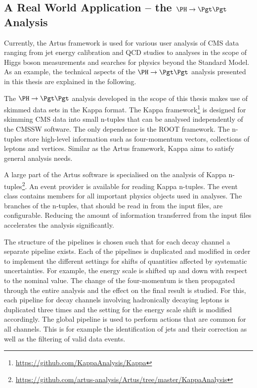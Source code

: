\documentclass[a4paper, oneside, 10pt]{scrartcl}
\begin{document}
\subsection{A Real World Application -- the $\PH\to\Pgt\Pgt$ Analysis \label{section_artus_example_htt}}

Currently, the Artus framework is used for various user analysis of CMS data ranging from jet energy calibration and QCD studies to analyses in the scope of Higgs boson measurements and searches for physics beyond the Standard Model. As an example, the technical aspects of the $\PH\to\Pgt\Pgt$ analysis presented in this thesis are explained in the following.

The $\PH\to\Pgt\Pgt$ analysis developed in the scope of this thesis makes use of skimmed data sets in the Kappa format. The Kappa framework\footnote{\url{https://github.com/KappaAnalysis/Kappa}} is designed for skimming CMS data into small n-tuples that can be analysed independently of the CMSSW software. The only dependence is the ROOT framework. The n-tuples store high-level information such as four-momentum vectors, collections of leptons and vertices. Similar as the Artus framework, Kappa aims to satisfy general analysis needs.

A large part of the Artus software is specialised on the analysis of Kappa n-tuples\footnote{\url{https://github.com/artus-analysis/Artus/tree/master/KappaAnalysis}}. An event provider is available for reading Kappa n-tuples. The event class contains members for all important physics objects used in analyses. The branches of the n-tuples, that should be read in from the input files, are configurable. Reducing the amount of information transferred from the input files accelerates the analysis significantly.

The structure of the pipelines is chosen such that for each decay channel a separate pipeline exists. Each of the pipelines is duplicated and modified in order to implement the different settings for shifts of quantities affected by systematic uncertainties. For example, the \Pgt energy scale is shifted up and down with respect to the nominal value. The change of the \Pgt four-momentum is then propagated through the entire analysis and the effect on the final result is studied. For this, each pipeline for decay channels involving hadronically decaying \Pgt leptons is duplicated three times and the setting for the \Pgt energy scale shift is modified accordingly. The global pipeline is used to perform actions that are common for all channels. This is for example the identification of jets and their correction as well as the filtering of valid data events.
\end{document}
